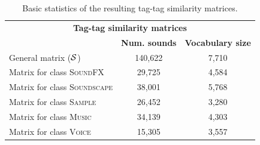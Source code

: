\begin{table}
\footnotesize
  \begin{center}
\begin{tabular}{lcc}
\toprule
\multicolumn{3}{c}{\textbf{Tag-tag similarity matrices}} \\  
& \textbf{Num. sounds} & \textbf{Vocabulary size} \\ 
\midrule

General matrix ($\mathcal{S}$) & 140,622 & 7,710 \\ 
Matrix for class \textsc{SoundFX} & 29,725 & 4,584 \\
Matrix for class \textsc{Soundscape} & 38,001 & 5,768 \\ 
Matrix for class \textsc{Sample} & 26,452 & 3,280 \\ 
Matrix for class \textsc{Music} & 34,139 & 4,303 \\ 
Matrix for class \textsc{Voice} & 15,305 & 3,557 \\
\bottomrule
\end{tabular}
  \caption[Basic statistics of the tag-tag similarity matrices]{Basic statistics of the resulting tag-tag similarity matrices.}
\label{tab:freesound_stats_sim_matrix}
  \end{center}
\end{table}


